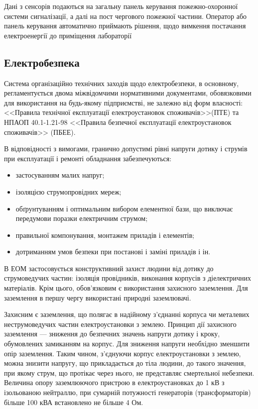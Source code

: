 \documentclass[ukrainian,utf8,simple,floatsubsection, hpadding=5mm,equationsubsection,]{eskdtext}
\begin{document}
Дані з сенсорів подаються на загальну панель керування пожежно-охоронної системи
сигналізації, а далі на пост чергового пожежної частини. Оператор або панель
керування автоматично приймають рішення, щодо вимкення постачання електроенергії
до приміщення лабораторії

\subsection{Електробезпека}

Система організаційно технічних заходів щодо електробезпеки, в основному, регламентується
двома міжвідомчими нормативними документами, обовязковими для використання на будь-якому 
підприємстві, не залежно від форм власності: <<Правила технічної експлуатації електроустановок споживачів>>(ПТЕ) та
НПАОП 40.1-1.21-98 <<Правила безпечної експлуатації електроустановок споживачів>> (ПБЕЕ).

В відповідності з вимогами, гранично допустимі рівні напруги дотику і 
струмів при експлуатації і ремонті обладнання забезпечуються:
\begin{itemize}
 \item застосуванням малих напруг; 
 \item ізоляцією струмопровідних мереж; 
 \item обґрунтуванням і оптимальним вибором елементної бази, що виключає передумови 
поразки електричним струмом; 
 \item правильної компонування, монтажем приладів і елементів; 
 \item дотриманням умов безпеки при постанові і заміні приладів і ін.
\end{itemize}

В ЕОМ застосовується конструктивний захист людини від дотику до струмоведучих частин: 
ізоляція провідників, виконання корпусів з діелектричних матеріалів. Крім цього, 
обов'язковим є використання захисного заземлення. Для заземлення в першу чергу використані природні заземлювачі.

Захисним є заземлення, що полягає в надійному з'єднанні  корпуса чи  металевих неструмоведучих 
частин електроустановки з землею. Принцип дії захисного заземлення --- зниження до безпечних значень 
напруги дотику і кроку, обумовлених замиканням на корпус. Для зниження напруги необхідно зменшити 
опір заземлення. Таким чином, з'єднуючи корпус електроустановки з землею, можна знизити напругу, 
що прикладається до тіла людини, до такого значення, при якому струм, що протікає через нього, не 
представляє  смертельної небезпеки. Величина опору заземлюючого пристрою  в електроустановках до
1 кВ з ізольованою нейтраллю, при сумарній потужності генераторів (трансформаторів) більше 100 кВА
встановлено не більше 4 Ом.
\end{document}
